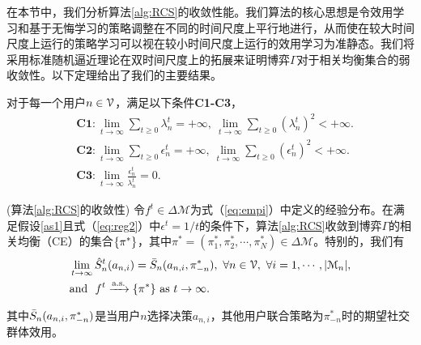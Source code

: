 在本节中，我们分析算法\ref{alg:RCS}的收敛性能。我们算法的核心思想是令效用学习和基于无悔学习的策略调整在不同的时间尺度上平行地进行，从而使在较大时间尺度上运行的策略学习可以视在较小时间尺度上运行的效用学习为准静态。我们将采用标准随机逼近理论在双时间尺度上的拓展来证明博弈$\Gamma$对于相关均衡集合的弱收敛性。以下定理给出了我们的主要结果。
\begin{as}\label{as1}
对于每一个用户$n\in\mathcal{V}$，满足以下条件\textbf{C1-C3}，
\vspace{-0.2cm}
\begin{align}
&\textbf{C1}:\lim_{t\rightarrow\infty}\sum_{t\geq0}\lambda^t_n=+\infty,~\lim_{t\rightarrow\infty}\sum_{t\geq0}(\lambda^t_n)^2<+\infty.\\
&\textbf{C2}:\lim_{t\rightarrow\infty}\sum_{t\geq0}\epsilon^t_n=+\infty,~\lim_{t\rightarrow\infty}\sum_{t\geq0}(\epsilon^t_n)^2<+\infty.\\
&\textbf{C3}:\lim_{t\rightarrow\infty}\frac{\epsilon^t_n}{\lambda^t_n}=0.
\end{align}
\end{as}
\vspace{-0.3cm}
\begin{thm}(算法\ref{alg:RCS}的收敛性)\label{thm:conv}
令$f^t\in\Delta\mathcal{M}$为式（\ref{eq:empi}）中定义的经验分布。在满足假设\ref{as1}且式（\ref{eq:reg2}）中$\epsilon^t=1/t$的条件下，算法\ref{alg:RCS}收敛到博弈$\Gamma$的相关均衡（CE）的集合$\{\pi^*\}$，其中$\pi^*=(\pi^*_1,\pi^*_2,\cdots,\pi^*_N)\in\Delta\mathcal{M}$。特别的，我们有
\begin{align}\label{sne}
&\lim_{t\rightarrow\infty}\hat{S}^t_n(a_{n,i})=\bar{S}_n(a_{n,i},\pi^*_{-n}),~\forall n\in\mathcal{V},~\forall i=1,\cdots,|\mathcal{M}_n|,\\
&\mbox{and}~~f^t\xrightarrow[\text{}]{\text{a.s.}}\{\pi^*\}~\mbox{as}~t\rightarrow\infty.
\end{align}
其中$\bar{S}_n(a_{n,i},\pi^*_{-n})$是当用户$n$选择决策$a_{n,i}$，其他用户联合策略为$\pi^*_{-n}$时的期望社交群体效用。
\end{thm}

